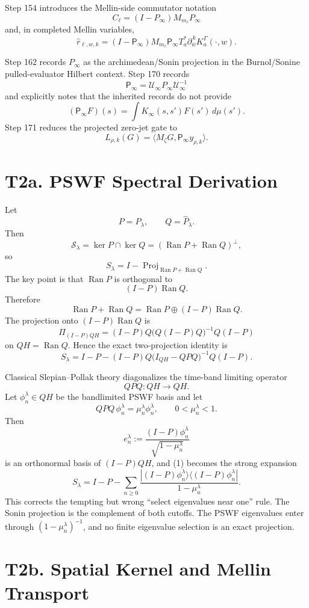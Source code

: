 \documentclass[11pt]{article}
\newcommand{\Psym}{\mathsf P_\infty}
\newcommand{\Pinf}{P_\infty}
\newcommand{\Uinf}{\mathcal U_\infty}
\newcommand{\Mz}{M_\zeta}
\newcommand{\Ran}{\operatorname{Ran}}
\begin{document}
Step 154 introduces the Mellin-side commutator notation
\[
C_\ell=(I-\Pinf)M_{m_\ell}\Pinf
\]
and, in completed Mellin variables,
\[
\widehat r_{\ell,w,k}
=(I-\Psym)M_{m_\ell}\Psym T_a^*
\partial_{\overline w}^{\,k}K_a^\Gamma(\cdot,w).
\]

Step 162 records \(P_\infty\) as the archimedean/Sonin projection in the
Burnol/Sonine pulled-evaluator Hilbert context.  Step 170 records
\[
\Psym=\Uinf P_\infty\Uinf^{-1}
\]
and explicitly notes that the inherited records do not provide
\[
(\Psym F)(s)=\int K_\infty(s,s')F(s')\,d\mu(s').
\]
Step 171 reduces the projected zero-jet gate to
\[
L_{\rho,k}(G)=
\langle \Mz G,\Psym y_{\rho,k}\rangle.
\]

\section{T2a. PSWF Spectral Derivation}

Let
\[
P=P_\lambda,\qquad Q=\widehat P_\lambda.
\]
Then
\[
\mathcal S_\lambda=\ker P\cap\ker Q
=(\Ran P+\Ran Q)^\perp,
\]
so
\[
S_\lambda=I-\operatorname{Proj}_{\Ran P+\Ran Q}.
\]
The key point is that \(\Ran P\) is orthogonal to
\[
(I-P)\Ran Q.
\]
Therefore
\[
\Ran P+\Ran Q=\Ran P\oplus (I-P)\Ran Q.
\]
The projection onto \((I-P)\Ran Q\) is
\[
\Pi_{(I-P)QH}
=(I-P)Q\bigl(Q(I-P)Q\bigr)^{-1}Q(I-P)
\]
on \(QH=\Ran Q\).  Hence the exact two-projection identity is
\[
\boxed{
S_\lambda
=
I-P
-
(I-P)Q\bigl(I_{QH}-QPQ\bigr)^{-1}Q(I-P).
}
\tag{1}
\]

Classical Slepian--Pollak theory diagonalizes the time-band limiting operator
\[
QPQ:QH\to QH.
\]
Let \(\phi_n^\lambda\in QH\) be the bandlimited PSWF basis and let
\[
QPQ\,\phi_n^\lambda=\mu_n^\lambda\phi_n^\lambda,
\qquad 0<\mu_n^\lambda<1.
\]
Then
\[
e_n^\lambda
:=
\frac{(I-P)\phi_n^\lambda}{\sqrt{1-\mu_n^\lambda}}
\]
is an orthonormal basis of \((I-P)QH\), and (1) becomes the strong expansion
\[
\boxed{
S_\lambda
=
I-P
-
\sum_{n\ge0}
\frac{|(I-P)\phi_n^\lambda\rangle
      \langle (I-P)\phi_n^\lambda|}
     {1-\mu_n^\lambda}.
}
\tag{2}
\]
This corrects the tempting but wrong ``select eigenvalues near one'' rule.
The Sonin projection is the complement of both cutoffs.  The PSWF eigenvalues
enter through \((1-\mu_n^\lambda)^{-1}\), and no finite eigenvalue selection is
an exact projection.

\section{T2b. Spatial Kernel and Mellin Transport}
\end{document}
